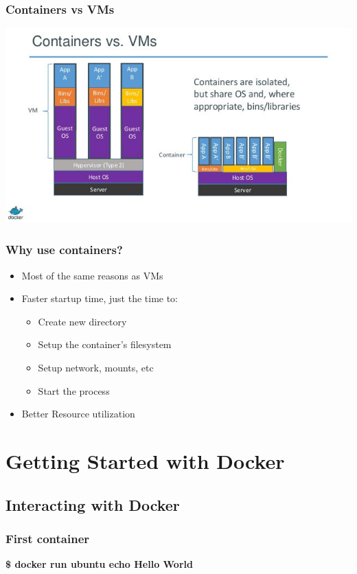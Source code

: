 \documentclass[aspectratio=169,11pt,hyperref={colorlinks=true}]{beamer}
\begin{document}
\begin{frame}
    \frametitle{Containers vs VMs}
    \centering
    \includegraphics[width=.9\textwidth]{containers-vs-vm.jpg}
\end{frame}

\begin{frame}
    \frametitle{Why use containers?}
    \begin{itemize}
        \item Most of the same reasons as VMs
        \item Faster startup time, just the time to:
            \begin{itemize}
                \item Create new directory
                \item Setup the container's filesystem
                \item Setup network, mounts, etc
                \item Start the process
            \end{itemize}
        \item Better Resource utilization
    \end{itemize}
\end{frame}

\section{Getting Started with Docker}
\subsection{Interacting with Docker}
\begin{frame}
    \frametitle{First container}
    \textbf{\$ docker run ubuntu echo Hello World} \\
\end{frame}
\end{document}
